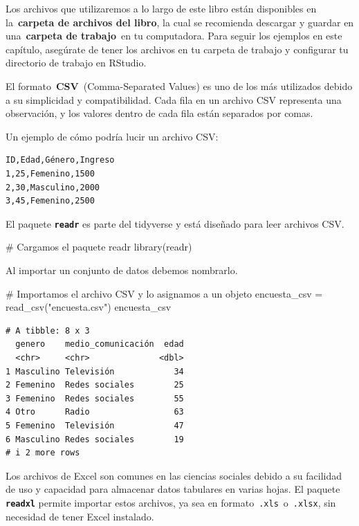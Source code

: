 \documentclass[
  letterpaper,
  DIV=11,
  numbers=noendperiod,
  twoside]{scrreprt}
\newenvironment{Shaded}{\begin{snugshade}}{\end{snugshade}}
\newcommand{\CommentTok}[1]{\textcolor[rgb]{0.37,0.37,0.37}{#1}}
\newcommand{\FunctionTok}[1]{\textcolor[rgb]{0.28,0.35,0.67}{#1}}
\newcommand{\NormalTok}[1]{\textcolor[rgb]{0.00,0.23,0.31}{#1}}
\newcommand{\OtherTok}[1]{\textcolor[rgb]{0.00,0.23,0.31}{#1}}
\newcommand{\StringTok}[1]{\textcolor[rgb]{0.13,0.47,0.30}{#1}}
\begin{document}
Los archivos que utilizaremos a lo largo de este libro están disponibles
en la~\textbf{carpeta de archivos del libro}, la cual se recomienda
descargar y guardar en una~\textbf{carpeta de trabajo}~en tu
computadora. Para seguir los ejemplos en este capítulo, asegúrate de
tener los archivos en tu carpeta de trabajo y configurar tu directorio
de trabajo en RStudio.

El formato~\textbf{CSV}~(Comma-Separated Values) es uno de los más
utilizados debido a su simplicidad y compatibilidad. Cada fila en un
archivo CSV representa una observación, y los valores dentro de cada
fila están separados por comas.

Un ejemplo de cómo podría lucir un archivo CSV:

\begin{verbatim}
ID,Edad,Género,Ingreso
1,25,Femenino,1500
2,30,Masculino,2000
3,45,Femenino,2500
\end{verbatim}

El paquete \textbf{\texttt{readr}} es parte del tidyverse y está
diseñado para leer archivos CSV.

\begin{Shaded}
\begin{Highlighting}[]
\CommentTok{\# Cargamos el paquete readr}
\FunctionTok{library}\NormalTok{(readr)}
\end{Highlighting}
\end{Shaded}

Al importar un conjunto de datos debemos nombrarlo.

\begin{Shaded}
\begin{Highlighting}[]
\CommentTok{\# Importamos el archivo CSV y lo asignamos a un objeto}
\NormalTok{encuesta\_csv }\OtherTok{=} \FunctionTok{read\_csv}\NormalTok{(}\StringTok{"encuesta.csv"}\NormalTok{)}
\NormalTok{encuesta\_csv}
\end{Highlighting}
\end{Shaded}

\begin{verbatim}
# A tibble: 8 x 3
  genero    medio_comunicación  edad
  <chr>     <chr>              <dbl>
1 Masculino Televisión            34
2 Femenino  Redes sociales        25
3 Femenino  Redes sociales        55
4 Otro      Radio                 63
5 Femenino  Televisión            47
6 Masculino Redes sociales        19
# i 2 more rows
\end{verbatim}

Los archivos de Excel son comunes en las ciencias sociales debido a su
facilidad de uso y capacidad para almacenar datos tabulares en varias
hojas. El paquete \textbf{\texttt{readxl}} permite importar estos
archivos, ya sea en formato~\texttt{.xls}~o~\texttt{.xlsx}, sin
necesidad de tener Excel instalado.
\end{document}
